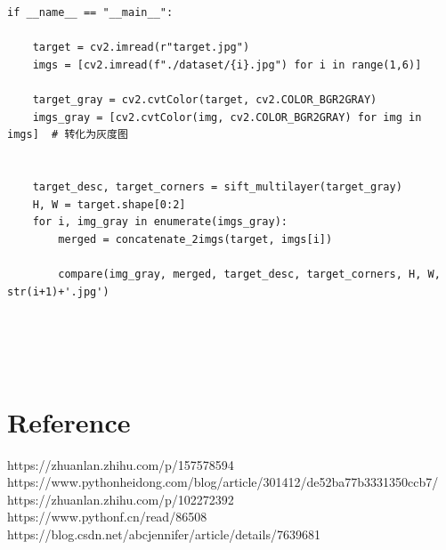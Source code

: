 \documentclass[12pt,a4paper]{article}
\begin{document}
\begin{lstlisting}[style=py]
if __name__ == "__main__":

    target = cv2.imread(r"target.jpg")
    imgs = [cv2.imread(f"./dataset/{i}.jpg") for i in range(1,6)]
   
    target_gray = cv2.cvtColor(target, cv2.COLOR_BGR2GRAY)
    imgs_gray = [cv2.cvtColor(img, cv2.COLOR_BGR2GRAY) for img in imgs]  # 转化为灰度图

 
    target_desc, target_corners = sift_multilayer(target_gray)
    H, W = target.shape[0:2]
    for i, img_gray in enumerate(imgs_gray):
        merged = concatenate_2imgs(target, imgs[i])
      
        compare(img_gray, merged, target_desc, target_corners, H, W, str(i+1)+'.jpg')





\end{lstlisting}
\section{Reference}
\noindent
https://zhuanlan.zhihu.com/p/157578594\\
https://www.pythonheidong.com/blog/article/301412/de52ba77b3331350ccb7/\\
https://zhuanlan.zhihu.com/p/102272392\\
https://www.pythonf.cn/read/86508\\
https://blog.csdn.net/abcjennifer/article/details/7639681\\
\end{document}

